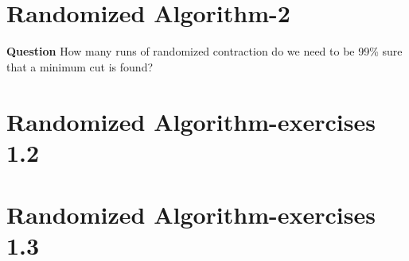\documentclass[12pt]{article}
\begin{document}
\section{Randomized Algorithm-2}
\textbf{Question}
How many runs of randomized contraction do we need to be 99\% sure that a minimum cut is found?

\section{Randomized Algorithm-exercises 1.2}

\section{Randomized Algorithm-exercises 1.3}
\end{document}

